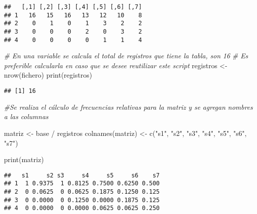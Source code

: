 \documentclass[
  12pt,
]{article}
\newenvironment{Shaded}{\begin{snugshade}}{\end{snugshade}}
\newcommand{\CommentTok}[1]{\textcolor[rgb]{0.56,0.35,0.01}{\textit{#1}}}
\newcommand{\FunctionTok}[1]{\textcolor[rgb]{0.00,0.00,0.00}{#1}}
\newcommand{\NormalTok}[1]{#1}
\newcommand{\OtherTok}[1]{\textcolor[rgb]{0.56,0.35,0.01}{#1}}
\newcommand{\SpecialCharTok}[1]{\textcolor[rgb]{0.00,0.00,0.00}{#1}}
\newcommand{\StringTok}[1]{\textcolor[rgb]{0.31,0.60,0.02}{#1}}
\begin{document}
\begin{verbatim}
##   [,1] [,2] [,3] [,4] [,5] [,6] [,7]
## 1   16   15   16   13   12   10    8
## 2    0    1    0    1    3    2    2
## 3    0    0    0    2    0    3    2
## 4    0    0    0    0    1    1    4
\end{verbatim}

\begin{Shaded}
\begin{Highlighting}[]
\CommentTok{\# En una variable se calcula el total de registros que tiene la tabla, son 16}
\CommentTok{\# Es preferible calcularla en caso que se desee reutilizar este script}
\NormalTok{registros }\OtherTok{\textless{}{-}} \FunctionTok{nrow}\NormalTok{(fichero)}
\FunctionTok{print}\NormalTok{(registros)}
\end{Highlighting}
\end{Shaded}

\begin{verbatim}
## [1] 16
\end{verbatim}

\begin{Shaded}
\begin{Highlighting}[]
\CommentTok{\#Se realiza el cálculo de frecuencias relativas para la matriz y se agregan nombres a las columnas }

\NormalTok{matriz }\OtherTok{\textless{}{-}}\NormalTok{ base }\SpecialCharTok{/}\NormalTok{ registros}
\FunctionTok{colnames}\NormalTok{(matriz) }\OtherTok{\textless{}{-}} \FunctionTok{c}\NormalTok{(}\StringTok{"s1"}\NormalTok{, }\StringTok{"s2"}\NormalTok{, }\StringTok{"s3"}\NormalTok{, }\StringTok{"s4"}\NormalTok{, }\StringTok{"s5"}\NormalTok{, }\StringTok{"s6"}\NormalTok{, }\StringTok{"s7"}\NormalTok{)}

\FunctionTok{print}\NormalTok{(matriz)}
\end{Highlighting}
\end{Shaded}

\begin{verbatim}
##   s1     s2 s3     s4     s5     s6    s7
## 1  1 0.9375  1 0.8125 0.7500 0.6250 0.500
## 2  0 0.0625  0 0.0625 0.1875 0.1250 0.125
## 3  0 0.0000  0 0.1250 0.0000 0.1875 0.125
## 4  0 0.0000  0 0.0000 0.0625 0.0625 0.250
\end{verbatim}
\end{document}
